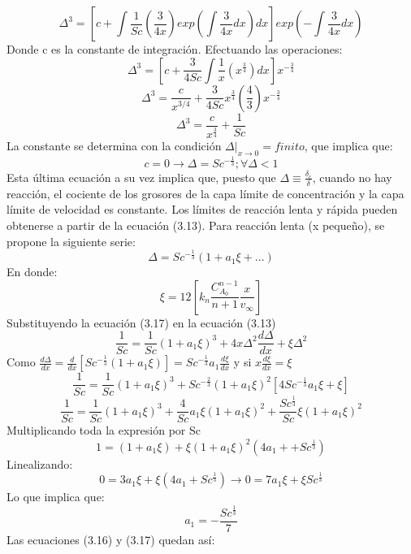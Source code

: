 \documentclass{article}
\begin{document}
\begin{equation*}
    \Delta^3=[c+\int \frac{1}{Sc}(\frac{3}{4x})exp(\int\frac{3}{4x}dx)dx]exp(-\int \frac{3}{4x}dx)
\end{equation*}
Donde c es la constante de integración. Efectuando las operaciones:
\begin{equation*}
    \Delta^3=[c+\frac{3}{4 Sc}\int \frac{1}{x}(x^{\frac{3}{4}})dx]x^{-\frac{3}{4}}
\end{equation*}
\begin{equation*}
    \Delta^3=\frac{c}{x^{3/4}}+\frac{3}{4Sc}x^{\frac{3}{4}}(\frac{4}{3})x^{-\frac{3}{4}}
\end{equation*}
\begin{equation}
    \Delta^3=\frac{c}{x^{\frac{3}{4}}}+\frac{1}{Sc}
\end{equation}
La constante se determina con la condición $\Delta|_{x\rightarrow 0}=finito$, que implica que:
\begin{equation}
    c=0\rightarrow\Delta= Sc^{-\frac{1}{3}}; \forall\Delta<1
\end{equation}
Esta última ecuación a su vez implica que, puesto que $\Delta\equiv\frac{\delta_c}{\delta}$, cuando no hay reacción, el cociente de los grosores de la capa límite de concentración y la capa límite de velocidad es constante. Los límites de reacción lenta y rápida pueden obtenerse a partir de la ecuación (3.13). Para reacción lenta (x pequeño), se propone la siguiente serie:
\begin{equation}
    \Delta= Sc^{-\frac{1}{3}}(1+a_1\xi+...)
\end{equation}
En donde:
\begin{equation}
    \xi=12[k_n\frac{C_{A_0}^{n-1}}{n+1}\frac{x}{v_\infty}]
\end{equation}
Substituyendo la ecuación (3.17) en la ecuación (3.13)
\begin{equation*}
    \frac{1}{Sc}=\frac{1}{Sc}(1+a_1\xi)^3+4x\Delta^2\frac{d\Delta}{dx}+\xi\Delta^2
\end{equation*}
Como $\frac{d\Delta}{dx}=\frac{d}{dx}[Sc^{-\frac{1}{3}}(1+a_1\xi)]=Sc^{-\frac{1}{3}}a_1\frac{d\xi}{dx}$ y si $x\frac{d\xi}{dx}=\xi$
\begin{equation*}
    \frac{1}{Sc}=\frac{1}{Sc}(1+a_1\xi)^3+Sc^{-\frac{2}{3}}(1+a_1\xi)^2[4Sc^{-\frac{1}{3}}a_1\xi+\xi]
\end{equation*}
\begin{equation*}
    \frac{1}{Sc}=\frac{1}{Sc}(1+a_1\xi)^3+\frac{4}{Sc}a_1\xi (1+a_1\xi)^2+\frac{Sc^{\frac{1}{3}}}{Sc}\xi(1+a_1\xi)^2
\end{equation*}
Multiplicando toda la expresión por Sc
\begin{equation*}
    1=(1+a_1\xi)+\xi(1+a_1\xi)^2(4a_1++Sc^{\frac{1}{3}})
\end{equation*}
Linealizando:
\begin{equation*}
    0=3a_1\xi+\xi(4a_1+Sc^{\frac{1}{3}})\rightarrow0=7a_1\xi+\xi Sc^{\frac{1}{3}}
\end{equation*}
Lo que implica que:
\begin{equation}
    a_1=-\frac{Sc^{\frac{1}{3}}}{7}
\end{equation}
Las ecuaciones (3.16) y (3.17) quedan así: 
\end{document}
